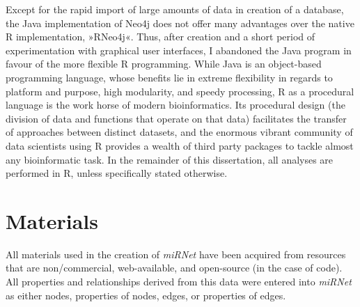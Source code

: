 Except for the rapid import of large amounts of data in creation of a database, the Java implementation of Neo4j does not offer many advantages over the native R implementation, »RNeo4j«. Thus, after creation and a short period of experimentation with graphical user interfaces, I abandoned the Java program in favour of the more flexible R programming. While Java is an object-based programming language, whose benefits lie in extreme flexibility in regards to platform and purpose, high modularity, and speedy processing, R as a procedural language is the work horse of modern bioinformatics. Its procedural design (the division of data and functions that operate on that data) facilitates the transfer of approaches between distinct datasets, and the enormous vibrant community of data scientists using R provides a wealth of third party packages to tackle almost any bioinformatic task. In the remainder of this dissertation, all analyses are performed in R, unless specifically stated otherwise.


\section{Materials}
All materials used in the creation of \textit{miRNet} have been acquired from resources that are non\-/commercial, web-available, and open-source (in the case of code). All properties and relationships derived from this data were entered into \textit{miRNet} as either nodes, properties of nodes, edges, or properties of edges. 

